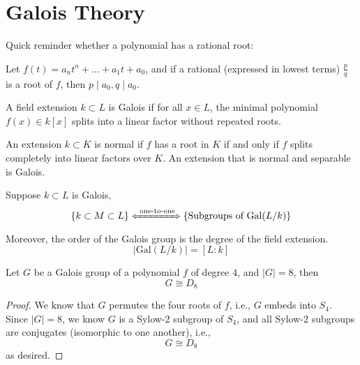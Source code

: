 \chapter{Galois Theory}



Quick reminder whether a polynomial has a rational root:
\begin{prop}
    Let $f(t)=a_nt^n+\dots+a_1t+a_0$, and if a rational (expressed in lowest terms) $\frac{p}{q}$ is a root of $f$, then $p\mid a_0, q\mid a_0$.
\end{prop}


\begin{defn}
    A field extension $k\subset L$ is Galois if for all $x\in L$, the minimal polynomial $f(x)\in k[x]$ splits into a linear factor without repeated roots.
\end{defn}
\begin{defn}
    An extension $k\subset K$ is normal if $f$ has a root in $K$ if and only if $f$ splits completely into linear factors over $K$. An extension that is normal and separable is Galois.
\end{defn}

\begin{thm}
    Suppose $k\subset L$ is Galois, 
    \begin{equation*}
        \left\{ k\subset M\subset L\right\} \xLeftrightarrow{\text{ one-to-one}} \left\{\text{Subgroups of Gal}(L/k) \right\}
    \end{equation*}
    Moreover, the order of the Galois group is the degree of the field extension.
    \begin{equation*}
        \left|\text{Gal}(L/k)\right|=[L:k]
    \end{equation*}
\end{thm}



\begin{prop}
    Let $G$ be a Galois group of a polynomial $f$ of degree $4$, and $|G|=8$, then 
    \begin{equation*}
        G\cong D_8
    \end{equation*}
\end{prop}
\begin{proof}
    We know that $G$ permutes the four roots of $f$, i.e., $G$ embeds into $S_4$. Since $|G|=8$, we know $G$ is a Sylow-$2$ subgroup of $S_4$, and all Sylow-$2$ subgroups are conjugates (isomorphic to one another), i.e., 
    \begin{equation*}
        G\cong D_8
    \end{equation*}
    as desired.
\end{proof}

